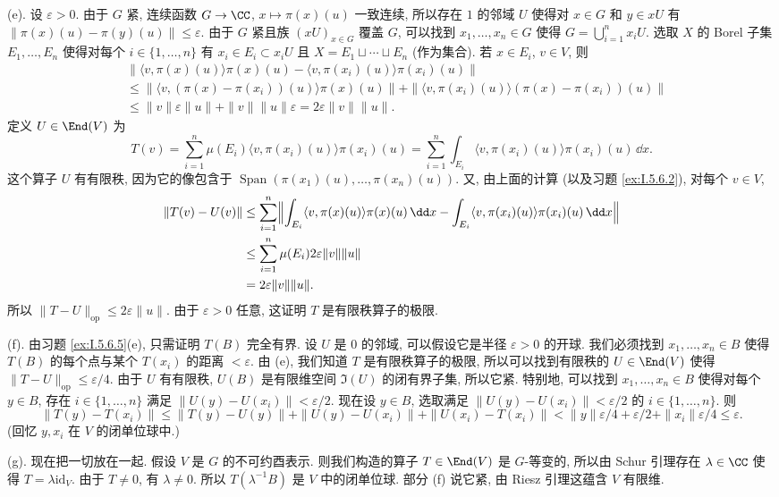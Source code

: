 \begin{solution}
(e). 设 $\varepsilon > 0$. 由于 $G$ 紧, 连续函数 $G \to \CC$, $x \longmapsto \pi(x)(u)$ 一致连续, 所以存在 $1$ 的邻域 $U$ 使得对 $x \in G$ 和 $y \in xU$ 有 $\|\pi(x)(u) - \pi(y)(u)\| \leq \varepsilon$. 由于 $G$ 紧且族 $(xU)_{x \in G}$ 覆盖 $G$, 可以找到 $x_1, \ldots, x_n \in G$ 使得 $G = \bigcup_{i=1}^n x_iU$. 选取 $X$ 的 Borel 子集 $E_1, \ldots, E_n$ 使得对每个 $i \in \{1, \ldots, n\}$ 有 $x_i \in E_i \subset x_iU$ 且 $X = E_1 \sqcup \cdots \sqcup E_n$ (作为集合). 若 $x \in E_i$, $v \in V$, 则
\begin{align*}
&\|\langle v, \pi(x)(u) \rangle\pi(x)(u) - \langle v, \pi(x_i)(u) \rangle\pi(x_i)(u)\| \\
&\leq \|\langle v, (\pi(x) - \pi(x_i))(u) \rangle\pi(x)(u)\| + \|\langle v, \pi(x_i)(u) \rangle(\pi(x) - \pi(x_i))(u)\| \\
&\leq \|v\|\varepsilon\|u\| + \|v\|\|u\|\varepsilon = 2\varepsilon\|v\|\|u\|.
\end{align*}
定义 $U \in \End(V)$ 为
\[
T(v) = \sum_{i=1}^n\mu(E_i)\langle v, \pi(x_i)(u) \rangle\pi(x_i)(u) = \sum_{i=1}^n\int_{E_i}\langle v, \pi(x_i)(u) \rangle\pi(x_i)(u)\,\dd x.
\]
这个算子 $U$ 有有限秩, 因为它的像包含于 $\operatorname{Span}(\pi(x_1)(u), \ldots, \pi(x_n)(u))$. 又, 由上面的计算 (以及习题 \ref{ex:I.5.6.2}), 对每个 $v \in V$,
\begin{align*}
\|T(v) - U(v)\| &\leq \sum_{i=1}^n\Bigl\|\int_{E_i}\langle v, \pi(x)(u) \rangle\pi(x)(u)\,\dd x - \int_{E_i}\langle v, \pi(x_i)(u) \rangle\pi(x_i)(u)\,\dd x\Bigr\| \\
&\leq \sum_{i=1}^n\mu(E_i)2\varepsilon\|v\|\|u\| \\
&= 2\varepsilon\|v\|\|u\|.
\end{align*}
所以 $\|T - U\|_{\mathrm{op}} \leq 2\varepsilon\|u\|$. 由于 $\varepsilon > 0$ 任意, 这证明 $T$ 是有限秩算子的极限.

(f). 由习题 \ref{ex:I.5.6.5}(e), 只需证明 $T(B)$ 完全有界. 设 $U$ 是 $0$ 的邻域, 可以假设它是半径 $\varepsilon > 0$ 的开球. 我们必须找到 $x_1, \ldots, x_n \in B$ 使得 $T(B)$ 的每个点与某个 $T(x_i)$ 的距离 $< \varepsilon$.
由 (e), 我们知道 $T$ 是有限秩算子的极限, 所以可以找到有限秩的 $U \in \End(V)$ 使得 $\|T - U\|_{\mathrm{op}} \leq \varepsilon/4$. 由于 $U$ 有有限秩, $U(B)$ 是有限维空间 $\Im(U)$ 的闭有界子集, 所以它紧. 特别地, 可以找到 $x_1, \ldots, x_n \in B$ 使得对每个 $y \in B$, 存在 $i \in \{1, \ldots, n\}$ 满足 $\|U(y) - U(x_i)\| < \varepsilon/2$.
现在设 $y \in B$, 选取满足 $\|U(y) - U(x_i)\| < \varepsilon/2$ 的 $i \in \{1, \ldots, n\}$. 则
\[
\|T(y) - T(x_i)\| \leq \|T(y) - U(y)\| + \|U(y) - U(x_i)\| + \|U(x_i) - T(x_i)\| < \|y\|\varepsilon/4 + \varepsilon/2 + \|x_i\|\varepsilon/4 \leq \varepsilon.
\]
(回忆 $y, x_i$ 在 $V$ 的闭单位球中.)

(g). 现在把一切放在一起. 假设 $V$ 是 $G$ 的不可约酉表示. 则我们构造的算子 $T \in \End(V)$ 是 $G$-等变的, 所以由 Schur 引理存在 $\lambda \in \CC$ 使得 $T = \lambda\mathrm{id}_V$. 由于 $T \neq 0$, 有 $\lambda \neq 0$. 所以 $T(\lambda^{-1}B)$ 是 $V$ 中的闭单位球. 部分 (f) 说它紧, 由 Riesz 引理这蕴含 $V$ 有限维.
\end{solution}

